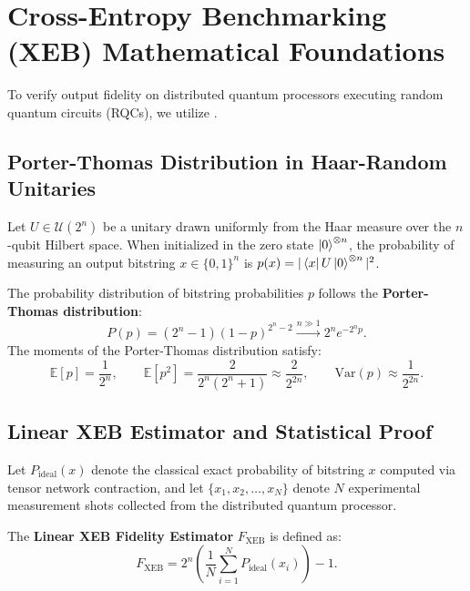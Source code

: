 \section{Cross-Entropy Benchmarking (XEB) Mathematical Foundations}
\label{sec:xeb_foundations}

To verify output fidelity on distributed quantum processors executing random quantum circuits (RQCs), we utilize .

\subsection{Porter-Thomas Distribution in Haar-Random Unitaries}
Let $U \in \mathcal{U}(2^n)$ be a unitary drawn uniformly from the Haar measure over the $n$-qubit Hilbert space. When initialized in the zero state $\ket{0}^{\otimes n}$, the probability of measuring an output bitstring $x \in \{0, 1\}^n$ is $p(x) = |\bra{x} U \ket{0}^{\otimes n}|^2$. 

The probability distribution of bitstring probabilities $p$ follows the \textbf{Porter-Thomas distribution}:
\begin{equation}
    P(p) = (2^n - 1)(1 - p)^{2^n - 2} \xrightarrow{n \gg 1} 2^n e^{-2^n p}.
    \label{eq:porter_thomas_distribution}
\end{equation}
The moments of the Porter-Thomas distribution satisfy:
\begin{equation}
    \mathbb{E}[p] = \frac{1}{2^n}, \qquad \mathbb{E}[p^2] = \frac{2}{2^n (2^n + 1)} \approx \frac{2}{2^{2n}}, \qquad \text{Var}(p) \approx \frac{1}{2^{2n}}.
\end{equation}

\subsection{Linear XEB Estimator and Statistical Proof}
Let $P_{\text{ideal}}(x)$ denote the classical exact probability of bitstring $x$ computed via tensor network contraction, and let $\{x_1, x_2, \dots, x_N\}$ denote $N$ experimental measurement shots collected from the distributed quantum processor.

The \textbf{Linear XEB Fidelity Estimator} $F_{\text{XEB}}$ is defined as:
\begin{equation}
    F_{\text{XEB}} = 2^n \left( \frac{1}{N} \sum_{i=1}^N P_{\text{ideal}}(x_i) \right) - 1.
    \label{eq:linear_xeb_estimator}
\end{equation}

